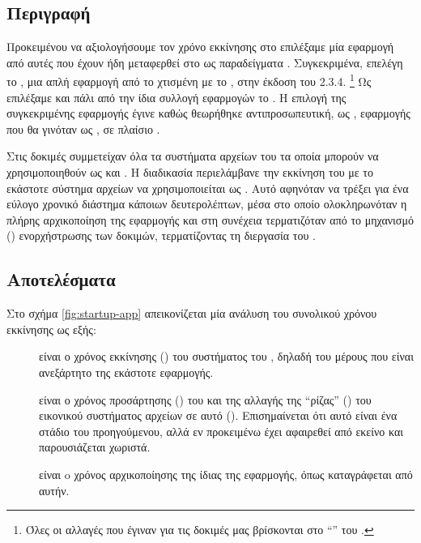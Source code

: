 \subsection{Περιγραφή}
Προκειμένου να αξιολογήσουμε τον χρόνο εκκίνησης στο \viofs{} επιλέξαμε μία
εφαρμογή από αυτές που έχουν ήδη μεταφερθεί στο \osv{} ως παραδείγματα
\cite{osv-apps}. Συγκεκριμένα, επελέγη το , μια απλή
 εφαρμογή από το \cite{spring-boot-examples}
χτισμένη με το , %
στην έκδοση του 2.3.4.%
\footnote{Όλες οι αλλαγές που έγιναν για τις δοκιμές μας βρίσκονται στο
``''  του .}
Ως  επιλέξαμε και πάλι από την ίδια
συλλογή εφαρμογών το . %
Η επιλογή της συγκεκριμένης εφαρμογής έγινε καθώς θεωρήθηκε αντιπροσωπευτική,
ως , εφαρμογής που θα γινόταν  ως
, σε πλαίσιο .

Στις δοκιμές συμμετείχαν όλα τα συστήματα αρχείων του \osv{} τα οποία μπορούν να
χρησιμοποιηθούν ως  και \viofs{}. Η
διαδικασία περιελάμβανε την εκκίνηση του \osv{} με το εκάστοτε σύστημα αρχείων
να χρησιμοποιείται ως . Αυτό αφηνόταν να τρέξει για ένα
εύλογο χρονικό διάστημα κάποιων δευτερολέπτων, μέσα στο οποίο ολοκληρωνόταν η
πλήρης αρχικοποίηση της εφαρμογής και στη συνέχεια τερματιζόταν από το μηχανισμό
() ενορχήστρωσης των δοκιμών, τερματίζοντας τη διεργασία του \qemu{}.

\subsection{Αποτελέσματα}
Στο σχήμα \ref{fig:startup-app} απεικονίζεται μία ανάλυση του συνολικού χρόνου
εκκίνησης ως εξής:
\begin{description}
    \item[] είναι ο χρόνος εκκίνησης () του συστήματος του
                         \osv{}, δηλαδή του μέρους που είναι ανεξάρτητο της
                         εκάστοτε εφαρμογής.
    \item[] είναι ο χρόνος προσάρτησης () του
                               και της αλλαγής της
                              ``ρίζας'' (\en{/}) του εικονικού συστήματος
                              αρχείων σε αυτό (). Επισημαίνεται ότι
                              αυτό είναι ένα στάδιο του προηγούμενου, αλλά εν
                              προκειμένω έχει αφαιρεθεί από εκείνο και
                              παρουσιάζεται χωριστά.
    \item[] είναι o χρόνος αρχικοποίησης της ίδιας της
                            εφαρμογής, όπως καταγράφεται από αυτήν.
\end{description}

